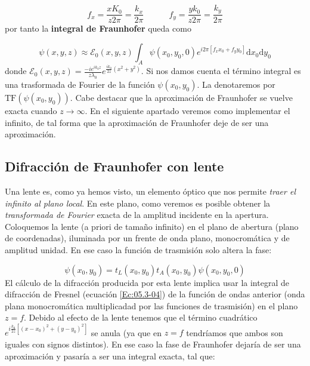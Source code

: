 \documentclass[12pt,a4paper]{book}
\numberwithin{equation}{section}
\numberwithin{figure}{section}
\newcommand{\tquad}{\quad \quad \quad}
\newcommand{\ccorchetes}[1]{\left[ #1  \right]}
\newcommand{\D}{\mathrm{d}}
\newcommand{\1}{_{(1)}}
\newcommand{\2}{_{(2)}}
\newcommand{\TF}{\mathrm{TF}}
\theoremstyle{definition}
\begin{document}
\begin{equation}
    f_x = \frac{xK_0}{z2\pi} = \frac{k_x}{2\pi} \tquad f_y = \frac{yk_0}{z 2 \pi} = \frac{k_y}{2\pi}
\end{equation}
por tanto la \textbf{integral de Fraunhofer} queda como

\begin{equation}
    \psi (x,y,z) \approx \mathcal{E}_0 (x,y,z) \int_A \psi (x_0,y_0,0) e^{i2\pi [f_x x_0 + f_y y_0]} \D x_0 \D y_0 \label{Ec:05.04-12}
\end{equation}
donde $\mathcal{E}_0 (x,y,z) = \frac{-ie^{ik_0z}}{z \lambda_0}e^{\frac{ik_0}{2z}(x^2+y^2)}$. Si nos damos cuenta el término integral es una trasformada de Fourier de la función $\psi(x_0,y_0)$. La denotaremos por $\TF(\psi(x_0,y_0))$. Cabe destacar que la aproximación de Fraunhofer se vuelve exacta cuando $z\rightarrow \infty$. En el siguiente apartado veremos como implementar el infinito, de tal forma que la aproximación de Fraunhofer deje de ser una aproximación.

\subsection{Difracción de Fraunhofer con lente}

Una lente es, como ya hemos visto, un elemento óptico que nos permite \textit{traer el infinito al plano local}. En este plano, como veremos es posible obtener la \textit{transformada de Fourier} exacta de la amplitud incidente en la apertura. Coloquemos la lente (a priori de tamaño infinito) en el plano de abertura (plano de coordenadas), iluminada por un frente de onda plano, monocromática y de amplitud unidad. En ese caso la función de trasmisión solo altera la fase:

\begin{equation}
    \psi (x_0,y_0) = t_L (x_0,y_0) t_A (x_0,y_0) \psi (x_0,y_0,0)
\end{equation}
El cálculo de la difracción producida por esta lente implica usar la integral de difracción de Fresnel (ecuación \ref{Ec:05.3-04}) de la función de ondas anterior (onda plana monocromática multiplicadad por las funciones de trasmisión) en el plano $z=f$. Debido al efecto de la lente tenemos que el término cuadrático $e^{i\frac{k_0}{2z}\ccorchetes{(x-x_0)^2+(y-y_0)^2}}$ se anula (ya que en $z=f$ tendríamos que ambos son iguales con signos distintos). En ese caso la fase de Fraunhofer dejaría de ser una aproximación y pasaría a ser una integral exacta, tal que:
\end{document}
